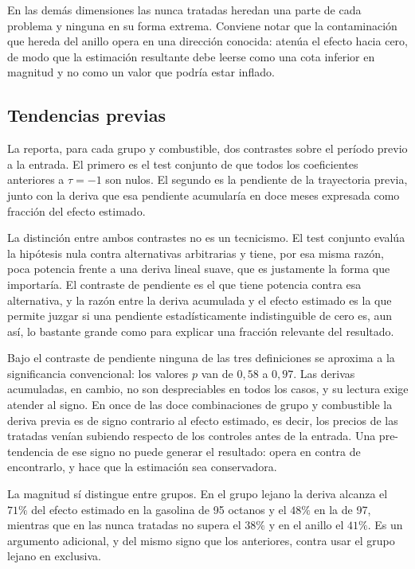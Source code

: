 En las demás dimensiones las nunca tratadas heredan una parte de cada problema y
ninguna en su forma extrema. Conviene notar que la contaminación que hereda del
anillo opera en una dirección conocida: atenúa el efecto hacia cero, de modo que
la estimación resultante debe leerse como una cota inferior en magnitud y no
como un valor que podría estar inflado.

\subsection{Tendencias previas}

La  reporta, para cada grupo y combustible, dos contrastes
sobre el período previo a la entrada. El primero es el test conjunto de que todos
los coeficientes anteriores a $\tau = -1$ son nulos. El segundo es la pendiente
de la trayectoria previa, junto con la deriva que esa pendiente acumularía en
doce meses expresada como fracción del efecto estimado.

\begin{table}[H]
\centering
\caption{Contrastes de tendencias previas por grupo de comparación}
\label{tab:pretend}
\end{table}

La distinción entre ambos contrastes no es un tecnicismo. El test conjunto
evalúa la hipótesis nula contra alternativas arbitrarias y tiene, por esa misma
razón, poca potencia frente a una deriva lineal suave, que es justamente la
forma que importaría. El contraste de pendiente es el que tiene potencia contra
esa alternativa, y la razón entre la deriva acumulada y el efecto estimado es la
que permite juzgar si una pendiente estadísticamente indistinguible de cero es,
aun así, lo bastante grande como para explicar una fracción relevante del
resultado.

Bajo el contraste de pendiente ninguna de las tres definiciones se aproxima a la
significancia convencional: los valores $p$ van de $0{,}58$ a $0{,}97$. Las
derivas acumuladas, en cambio, no son despreciables en todos los casos, y su
lectura exige atender al signo. En once de las doce combinaciones de grupo y
combustible la deriva previa es de signo contrario al efecto estimado, es decir,
los precios de las tratadas venían subiendo respecto de los controles antes de
la entrada. Una pre-tendencia de ese signo no puede generar el resultado: opera
en contra de encontrarlo, y hace que la estimación sea conservadora.

La magnitud sí distingue entre grupos. En el grupo lejano la deriva alcanza el
$71\%$ del efecto estimado en la gasolina de 95 octanos y el $48\%$ en la de 97,
mientras que en las nunca tratadas no supera el $38\%$ y en el anillo el $41\%$.
Es un argumento adicional, y del mismo signo que los anteriores, contra usar el
grupo lejano en exclusiva.


